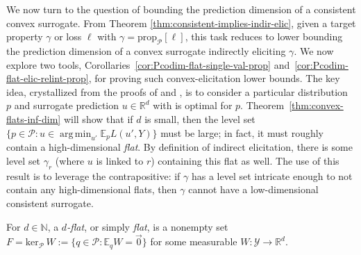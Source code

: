 \documentclass[anon,12pt]{colt2021} %
\newcommand{\Comments}{1}
\newcommand{\mytodo}[2]{\ifnum\Comments=1%
	\todo[linecolor=#1!80!black,backgroundcolor=#1,bordercolor=#1!80!black]{#2}\fi}
\newcommand{\jessiet}[1]{\mytodo{purple!20!white}{JF: #1}}
\newcommand{\reals}{\mathbb{R}}
\newcommand{\simplex}{\Delta_\Y}
\newcommand{\prop}[2][\mathcal{P}]{\mathrm{prop}_{#1}[#2]}
\newcommand{\spn}{\mathrm{span}}
\newcommand{\zeros}[1]{\mathrm{ker}_\P\,#1}
\newcommand{\affhull}{\mathrm{affhull}}
\newcommand{\E}{\mathbb{E}}
\renewcommand{\P}{\mathcal{P}}
\newcommand{\Y}{\mathcal{Y}}
\newcommand{\exploss}[3]{\E_{#3} #1(#2,Y)}
\DeclareMathOperator*{\argmin}{arg\,min}
\begin{document}
We now turn to the question of bounding the prediction dimension of a consistent convex surrogate.
From Theorem \ref{thm:consistent-implies-indir-elic}, given a target property $\gamma$ or loss $\ell$ with $\gamma = \prop{\ell}$, this task reduces to lower bounding the prediction dimension of a convex surrogate indirectly eliciting $\gamma$.
We now explore two tools, Corollaries~\ref{cor:Pcodim-flat-single-val-prop} and~\ref{cor:Pcodim-flat-elic-relint-prop}, for proving such convex-elicitation lower bounds.
The key idea, crystallized from the proofs of \citet[Theorem 16]{ramaswamy2016convex} and \citet[Theorem~9]{agarwal2015consistent}, is to consider a particular distribution~$p$ and surrogate prediction $u \in \reals^d$ with is optimal for $p$.
Theorem~\ref{thm:convex-flats-inf-dim} will show that if $d$ is small, then the level set $\{p \in \P : u \in \argmin_{u'} \exploss{L}{u'}{p}\}$ must be large; in fact, it must roughly contain a high-dimensional \emph{flat}.
By definition of indirect elicitation, there is some level set $\gamma_r$ (where $u$ is linked to $r$) containing this flat as well.
The use of this result is to leverage the contrapositive: if $\gamma$ has a level set intricate enough to not contain any high-dimensional flats, then $\gamma$ cannot have a low-dimensional consistent surrogate.


\begin{definition}[Flat]\label{def:flat-general}
  For $d\in\mathbb N$, a \emph{$d$-flat}, or simply \emph{flat}, is a nonempty set $F = \zeros{W} := \{q \in \P : \E_q W = \vec 0\}$ for some measurable $W:\Y \to \reals^d$.
\end{definition}
\end{document}
